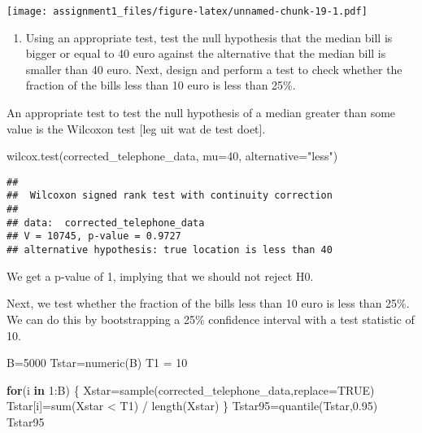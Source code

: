 \documentclass[
]{article}
\newenvironment{Shaded}{\begin{snugshade}}{\end{snugshade}}
\newcommand{\AttributeTok}[1]{\textcolor[rgb]{0.77,0.63,0.00}{#1}}
\newcommand{\ConstantTok}[1]{\textcolor[rgb]{0.00,0.00,0.00}{#1}}
\newcommand{\ControlFlowTok}[1]{\textcolor[rgb]{0.13,0.29,0.53}{\textbf{#1}}}
\newcommand{\DecValTok}[1]{\textcolor[rgb]{0.00,0.00,0.81}{#1}}
\newcommand{\FloatTok}[1]{\textcolor[rgb]{0.00,0.00,0.81}{#1}}
\newcommand{\FunctionTok}[1]{\textcolor[rgb]{0.00,0.00,0.00}{#1}}
\newcommand{\NormalTok}[1]{#1}
\newcommand{\OtherTok}[1]{\textcolor[rgb]{0.56,0.35,0.01}{#1}}
\newcommand{\SpecialCharTok}[1]{\textcolor[rgb]{0.00,0.00,0.00}{#1}}
\newcommand{\StringTok}[1]{\textcolor[rgb]{0.31,0.60,0.02}{#1}}
\providecommand{\tightlist}{%
  \setlength{\itemsep}{0pt}\setlength{\parskip}{0pt}}
\begin{document}
\texttt{[image: assignment1\_files/figure-latex/unnamed-chunk-19-1.pdf]}

\begin{enumerate}
\def\labelenumi{\alph{enumi})}
\setcounter{enumi}{4}
\tightlist
\item
  Using an appropriate test, test the null hypothesis that the median
  bill is bigger or equal to 40 euro against the alternative that the
  median bill is smaller than 40 euro. Next, design and perform a test
  to check whether the fraction of the bills less than 10 euro is less
  than 25\%.
\end{enumerate}

An appropriate test to test the null hypothesis of a median greater than
some value is the Wilcoxon test {[}leg uit wat de test doet{]}.

\begin{Shaded}
\begin{Highlighting}[]
\FunctionTok{wilcox.test}\NormalTok{(corrected\_telephone\_data, }\AttributeTok{mu=}\DecValTok{40}\NormalTok{, }\AttributeTok{alternative=}\StringTok{"less"}\NormalTok{)}
\end{Highlighting}
\end{Shaded}

\begin{verbatim}
## 
##  Wilcoxon signed rank test with continuity correction
## 
## data:  corrected_telephone_data
## V = 10745, p-value = 0.9727
## alternative hypothesis: true location is less than 40
\end{verbatim}

We get a p-value of 1, implying that we should not reject H0.

Next, we test whether the fraction of the bills less than 10 euro is
less than 25\%. We can do this by bootstrapping a 25\% confidence
interval with a test statistic of 10.

\begin{Shaded}
\begin{Highlighting}[]
\NormalTok{B}\OtherTok{=}\DecValTok{5000}
\NormalTok{Tstar}\OtherTok{=}\FunctionTok{numeric}\NormalTok{(B)}
\NormalTok{T1 }\OtherTok{=} \DecValTok{10}

\ControlFlowTok{for}\NormalTok{(i }\ControlFlowTok{in} \DecValTok{1}\SpecialCharTok{:}\NormalTok{B) \{}
\NormalTok{  Xstar}\OtherTok{=}\FunctionTok{sample}\NormalTok{(corrected\_telephone\_data,}\AttributeTok{replace=}\ConstantTok{TRUE}\NormalTok{)}
\NormalTok{  Tstar[i]}\OtherTok{=}\FunctionTok{sum}\NormalTok{(Xstar }\SpecialCharTok{\textless{}}\NormalTok{ T1) }\SpecialCharTok{/} \FunctionTok{length}\NormalTok{(Xstar)}
\NormalTok{  \}}
\NormalTok{Tstar95}\OtherTok{=}\FunctionTok{quantile}\NormalTok{(Tstar,}\FloatTok{0.95}\NormalTok{)}
\NormalTok{Tstar95}
\end{Highlighting}
\end{Shaded}
\end{document}
